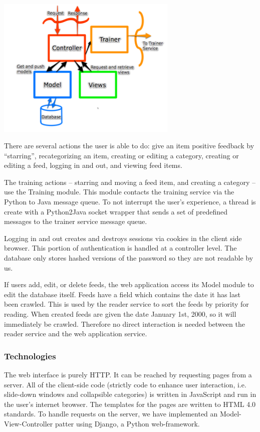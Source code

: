 \documentclass[letterpaper]{article}
\begin{document}
\noindent\includegraphics[width=3.4in]{MVC.png}

There are several actions the user is able to do: give an item positive feedback by ``starring'', recategorizing an item, creating or editing a category, creating or editing a feed, logging in and out, and viewing feed items.

The training actions -- starring and moving a feed item, and creating a category -- use the Training module. This module contacts the training service via the Python to Java message queue. To not interrupt the user's experience, a thread is create with a Python2Java socket wrapper that sends a set of predefined messages to the trainer service message queue.

Logging in and out creates and destroys sessions via cookies in the client side browser. This portion of authentication is handled at a controller level. The database only stores hashed versions of the password so they are not readable by us.

If users add, edit, or delete feeds, the web application access its Model module to edit the database itself.  Feeds have a field which contains the date it has last been crawled.  This is used by the reader service to sort the feeds by priority for reading.  When created feeds are given the date January 1st, 2000, so it will immediately be crawled.  Therefore no direct interaction is needed between the reader service and the web application service.

\subsubsection{Technologies}
The web interface is purely HTTP.  It can be reached by requesting pages from a server.  All of the client-side code (strictly code to enhance user interaction, i.e. slide-down windows and collapsible categories) is written in JavaScript and run in the user's internet browser. The templates for the pages are written to HTML 4.0 standards. To handle requests on the server, we have implemented an Model-View-Controller patter using Django, a Python web-framework.  
\end{document}
